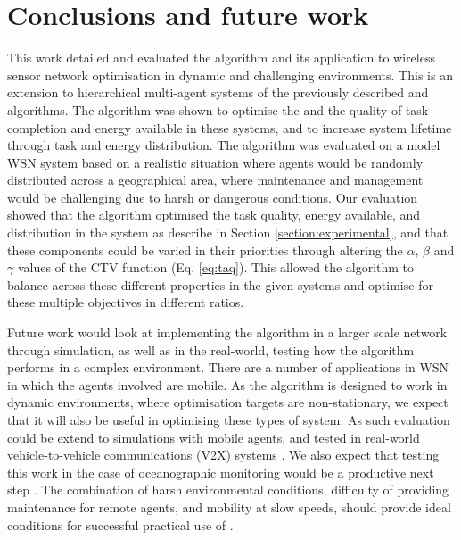 \section{Conclusions and future work}
\label{section:conclusions}

This work detailed and evaluated the \acronymWSNOptimisation{}{} algorithm and its application to wireless sensor network optimisation in dynamic and challenging environments. This is an extension to hierarchical multi-agent systems of the previously described \acronymATARIA{}{} and \acronymMGRAO{}{} algorithms. The algorithm was shown to optimise the and the quality of task completion and energy available in these systems, and to increase system lifetime through task and energy distribution. The algorithm was evaluated on a model WSN system based on a realistic situation where agents would be randomly distributed across a geographical area, where maintenance and management would be challenging due to harsh or dangerous conditions.  Our evaluation showed that the \acronymWSNOptimisation{}{} algorithm optimised the task quality, energy available, and distribution in the system as describe in Section \ref{section:experimental}, and that these components could be varied in their priorities through altering the $\alpha$, $\beta$ and $\gamma$ values of the CTV function (Eq. \ref{eq:taq}). This allowed the algorithm to balance across these different properties in the given systems and optimise for these multiple objectives in different ratios. 

Future work would look at implementing the algorithm in a larger scale network through simulation, as well as in the real-world, testing how the algorithm performs in a complex environment. There are a number of applications in WSN in which the agents involved are mobile. As the \acronymWSNOptimisation{}{} algorithm is designed to work in dynamic environments, where optimisation targets are non-stationary, we expect that it will also be useful in optimising these types of system. As such evaluation could be extend to simulations with mobile agents, and tested in real-world vehicle-to-vehicle communications (V2X) systems \citep{Gupta2017, Tong2019}. We also expect that testing this work in the case of oceanographic monitoring would be a productive next step \citep{Albaladejo2010a}. The combination of harsh environmental conditions, difficulty of providing maintenance for remote agents, and mobility at slow speeds, should provide ideal conditions for successful practical use of \acronymWSNOptimisation{}{}.


  